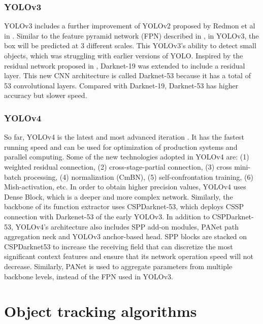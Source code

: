 \subsubsection{YOLOv3}
YOLOv3 includes a further improvement of YOLOv2 proposed by Redmon et al in \cite{DBLP:journals/corr/abs-1804-02767}. Similar to the feature pyramid network (FPN) described in \cite{DBLP:journals/corr/LinDGHHB16}, in YOLOv3, the box will be predicted at 3 different scales. This YOLOv3's ability to detect small objects, which was struggling with earlier versions of YOLO.
Inspired by the residual network proposed in \cite{DBLP:journals/corr/HeZRS15}, Darknet-19 was extended to include a residual layer. This new CNN architecture is called Darknet-53 because it has a total of 53 convolutional layers. Compared with Darknet-19, Darknet-53 has higher accuracy but slower speed.
\subsubsection{YOLOv4}
So far, YOLOv4 is the latest and most advanced iteration \cite{bochkovskiy2020yolov4}. It has the fastest running speed and can be used for optimization of production systems and parallel computing. Some of the new technologies adopted in YOLOv4 are: (1) weighted residual connection, (2) cross-stage-partial connection, (3) cross mini-batch processing, (4) normalization (CmBN), (5) self-confrontation training, (6) Mish-activation, etc. In order to obtain higher precision values, YOLOv4 uses Dense Block, which is a deeper and more complex network. Similarly, the backbone of its function extractor uses CSPDarknet-53, which deploys CSSP connection with Darkenet-53 of the early YOLOv3. In addition to CSPDarknet-53, YOLOv4's architecture also includes SPP add-on modules, PANet path aggregation neck and YOLOv3 anchor-based head. SPP blocks are stacked on CSPDarknet53 to increase the receiving field that can discretize the most significant context features and ensure that its network operation speed will not decrease. Similarly, PANet is used to aggregate parameters from multiple backbone levels, instead of the FPN used in YOLOv3.
\section{Object tracking algorithms}
